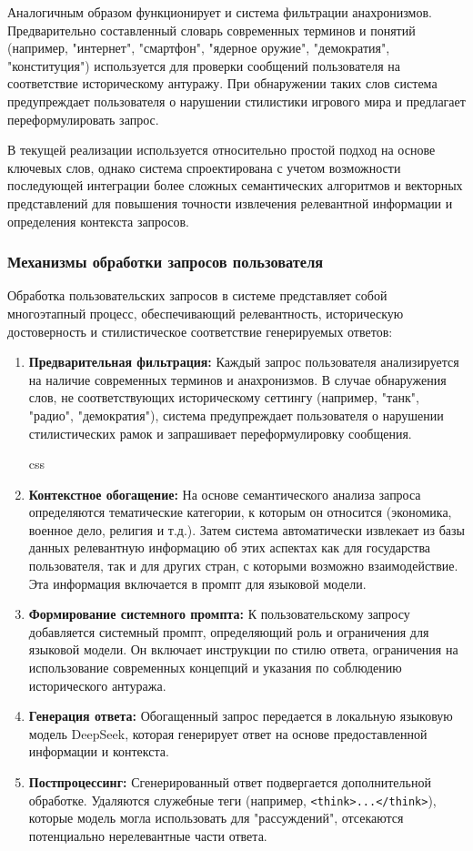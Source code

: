 Аналогичным образом функционирует и система фильтрации анахронизмов. Предварительно составленный словарь современных терминов и понятий (например, "интернет", "смартфон", "ядерное оружие", "демократия", "конституция") используется для проверки сообщений пользователя на соответствие историческому антуражу. При обнаружении таких слов система предупреждает пользователя о нарушении стилистики игрового мира и предлагает переформулировать запрос.

В текущей реализации используется относительно простой подход на основе ключевых слов, однако система спроектирована с учетом возможности последующей интеграции более сложных семантических алгоритмов и векторных представлений для повышения точности извлечения релевантной информации и определения контекста запросов.

\subsubsection{Механизмы обработки запросов пользователя}

Обработка пользовательских запросов в системе представляет собой многоэтапный процесс, обеспечивающий релевантность, историческую достоверность и стилистическое соответствие генерируемых ответов:

\begin{enumerate}
\item \textbf{Предварительная фильтрация:} Каждый запрос пользователя анализируется на наличие современных терминов и анахронизмов. В случае обнаружения слов, не соответствующих историческому сеттингу (например, "танк", "радио", "демократия"), система предупреждает пользователя о нарушении стилистических рамок и запрашивает переформулировку сообщения.

css
\item \textbf{Контекстное обогащение:} На основе семантического анализа запроса определяются тематические категории, к которым он относится (экономика, военное дело, религия и т.д.). Затем система автоматически извлекает из базы данных релевантную информацию об этих аспектах как для государства пользователя, так и для других стран, с которыми возможно взаимодействие. Эта информация включается в промпт для языковой модели.

\item \textbf{Формирование системного промпта:} К пользовательскому запросу добавляется системный промпт, определяющий роль и ограничения для языковой модели. Он включает инструкции по стилю ответа, ограничения на использование современных концепций и указания по соблюдению исторического антуража.

\item \textbf{Генерация ответа:} Обогащенный запрос передается в локальную языковую модель DeepSeek, которая генерирует ответ на основе предоставленной информации и контекста.

\item \textbf{Постпроцессинг:} Сгенерированный ответ подвергается дополнительной обработке. Удаляются служебные теги (например, \texttt{<think>...</think>}), которые модель могла использовать для "{}рассуждений"{}, отсекаются потенциально нерелевантные части ответа.
\end{enumerate}

